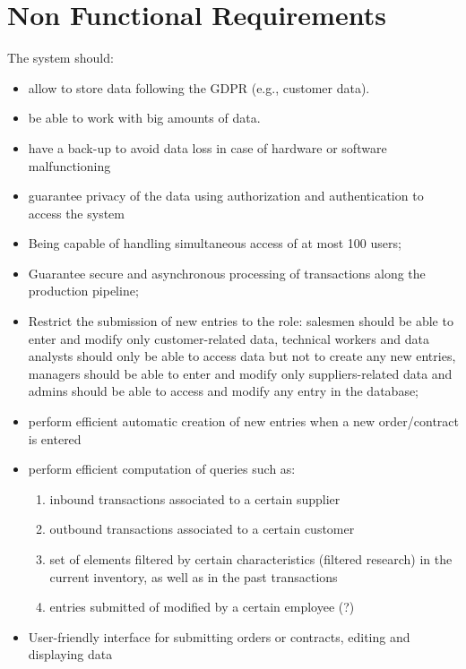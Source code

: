 \section{Non Functional Requirements}
The system should:
\begin{itemize}
    \item allow to store data following the GDPR (e.g., customer data).
    \item be able to work with big amounts of data.
    \item have a back-up to avoid data loss in case of hardware or software malfunctioning
    \item guarantee privacy of the data using authorization and authentication to access the system
    \item Being capable of handling simultaneous access of at most 100 users;
    \item Guarantee secure and asynchronous processing of transactions along the production pipeline;
    \item Restrict the submission of new entries to the role: salesmen should be able to enter and modify only customer-related data, technical workers and data analysts should only be able to access data but not to create any new entries, managers should be able to enter and modify only suppliers-related data and admins should be able to access and modify any entry in the database;
    \item perform efficient automatic creation of new entries when a new order/contract is entered 
    \item perform efficient computation of queries such as:
    \begin{enumerate}
	    \item inbound transactions associated to a certain supplier
	    \item outbound transactions associated to a certain customer
	    \item set of elements filtered by certain characteristics (filtered research) in the current inventory, as well as in the past transactions
   		\item entries submitted of modified by a certain employee (?)
    \end{enumerate}
    \item User-friendly interface for submitting orders or contracts, editing and displaying data
\end{itemize}


